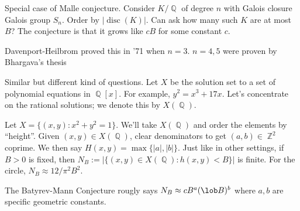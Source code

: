 \documentclass[11pt, a4paper]{memoir}
\DeclareMathOperator{\Q}{{\mathbb{Q}}}
\DeclareMathOperator{\Z}{{\mathbb{Z}}}
\theoremstyle{change}
\theoremstyle{plain}
\theoremstyle{nonumberplain}
\DeclareMathOperator{\disc}{disc}
\numberwithin{equation}{section}
\begin{document}
Special case of Malle conjecture.
Consider $K/\Q$ of degree $n$ with Galois closure Galois group $S_n$.
Order by $|\disc(K)|$.
Can ask how many such $K$ are at most $B$?
The conjecture is that it grows like $cB$ for some constant $c$.

Davenport-Heilbrom proved this in '71 when $n=3$.
$n=4,5$ were proven by Bhargava's thesis

Similar but different kind of questions.
Let $X$ be the solution set to a set of polynomial equations in $\Q[x]$.
For example, $y^2=x^3+17x$.
Let's concentrate on the rational solutions; we denote this by $X(\Q)$.

Let $X=\{(x,y):x^2+y^2=1\}$.
We'll take $X(\Q)$ and order the elements by ``height''.
Given $(x,y)\in X(\Q)$, clear denominators to get $(a,b)\in\Z^2$ coprime.
We then say $H(x,y)=\max\{|a|,|b|\}$.
Just like in other settings, if $B>0$ is fixed, then $N_B:=|\{(x,y)\in X(\Q):h(x,y)<B\}|$ is finite.
For the circle, $N_B\approx 12/\pi^2 B^2$.

The Batyrev-Mann Conjecture rougly says $N_B\approx cB^a(\lob B)^b$ where $a,b$ are specific geometric constants.
\end{document}
